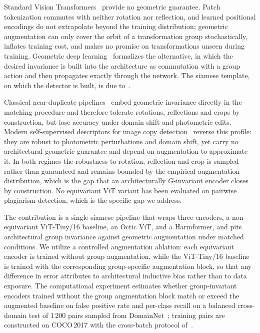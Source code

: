 \documentclass{article}
\begin{document}
Standard Vision Transformers~\citep{dosovitskiy2021image} provide no geometric guarantee. Patch tokenization commutes with neither rotation nor reflection, and learned positional encodings do not extrapolate beyond the training distribution; geometric augmentation can only cover the orbit of a transformation group stochastically, inflates training cost, and makes no promise on transformations unseen during training. Geometric deep learning~\citep{bronstein2021geometric, cohen2016group, weiler2019general} formalizes the alternative, in which the desired invariance is built into the architecture as commutation with a group action and then propagates exactly through the network. The siamese template, on which the detector is built, is due to~\citet{bromley1993signature}.

Classical near-duplicate pipelines~\citep{ke2004efficient} embed geometric invariance directly in the matching procedure and therefore tolerate rotations, reflections and crops by construction, but lose accuracy under domain shift and photometric edits. Modern self-supervised descriptors for image copy detection~\citep{pizzi2022sscd, kim2025rdcd} reverse this profile: they are robust to photometric perturbations and domain shift, yet carry no architectural geometric guarantee and depend on augmentation to approximate it. In both regimes the robustness to rotation, reflection and crop is sampled rather than guaranteed and remains bounded by the empirical augmentation distribution, which is the gap that an architecturally $G$-invariant encoder closes by construction. No equivariant ViT variant has been evaluated on pairwise plagiarism detection, which is the specific gap we address.

The contribution is a single siamese pipeline that wraps three encoders, a non-equivariant ViT-Tiny/16 baseline, an Octic ViT, and a Harmformer, and pits architectural group invariance against geometric augmentation under matched conditions. We utilize a controlled augmentation ablation: each equivariant encoder is trained without group augmentation, while the ViT-Tiny/16 baseline is trained with the corresponding group-specific augmentation block, so that any difference in error attributes to architectural inductive bias rather than to data exposure. The computational experiment estimates whether group-invariant encoders trained without the group augmentation block match or exceed the augmented baseline on false positive rate and per-class recall on a balanced cross-domain test of 1\,200 pairs sampled from DomainNet~\citep{peng2019domainnet}; training pairs are constructed on COCO\,2017 with the cross-batch protocol of~\citet{dorin2024pairwise}.
\end{document}
